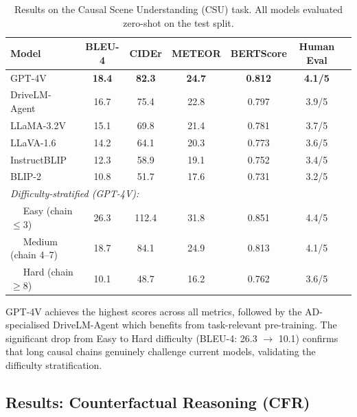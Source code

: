 \begin{table}[htbp]
  \centering
  \caption{Results on the Causal Scene Understanding (CSU) task.
  All models evaluated zero-shot on the \lucid{} test split.}
  \label{tab:csu_results}
  \small
  \begin{tabular}{lcccccc}
    \toprule
    \textbf{Model} & \textbf{BLEU-4} & \textbf{CIDEr} & \textbf{METEOR} & \textbf{BERTScore} & \textbf{Human Eval} \\
    \midrule
    GPT-4V           & \textbf{18.4} & \textbf{82.3} & \textbf{24.7} & \textbf{0.812} & \textbf{4.1/5} \\
    DriveLM-Agent    & 16.7 & 75.4 & 22.8 & 0.797 & 3.9/5 \\
    LLaMA-3.2V       & 15.1 & 69.8 & 21.4 & 0.781 & 3.7/5 \\
    LLaVA-1.6        & 14.2 & 64.1 & 20.3 & 0.773 & 3.6/5 \\
    InstructBLIP     & 12.3 & 58.9 & 19.1 & 0.752 & 3.4/5 \\
    BLIP-2           & 10.8 & 51.7 & 17.6 & 0.731 & 3.2/5 \\
    \midrule
    \multicolumn{6}{l}{\textit{Difficulty-stratified (GPT-4V):}} \\
    ~~ Easy (chain $\le 3$)    & 26.3 & 112.4 & 31.8 & 0.851 & 4.4/5 \\
    ~~ Medium (chain 4--7)     & 18.7 & 84.1  & 24.9 & 0.813 & 4.1/5 \\
    ~~ Hard (chain $\ge 8$)    & 10.1 & 48.7  & 16.2 & 0.762 & 3.6/5 \\
    \bottomrule
  \end{tabular}
\end{table}

GPT-4V achieves the highest scores across all metrics, followed by the AD-specialised
DriveLM-Agent which benefits from task-relevant pre-training. The significant
drop from Easy to Hard difficulty (BLEU-4: 26.3 $\to$ 10.1) confirms that long causal
chains genuinely challenge current models, validating the difficulty stratification.

\subsection{Results: Counterfactual Reasoning (CFR)}
\label{ssec:exp_cfr}

